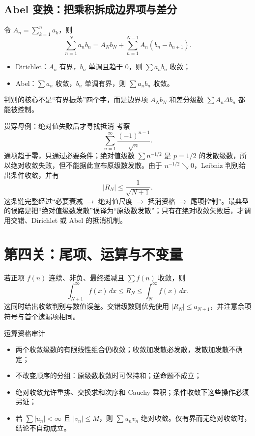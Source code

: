 \documentclass[11pt,a4paper,fontset=fandol]{ctexart}
\begin{document}
\subsection{Abel 变换：把乘积拆成边界项与差分}
令 $A_n=\sum_{k=1}^{n}a_k$，则
\[
\sum_{n=1}^{N}a_nb_n=A_Nb_N+\sum_{n=1}^{N-1}A_n(b_n-b_{n+1}).
\]
\begin{itemize}
  \item Dirichlet：$A_n$ 有界，$b_n$ 单调且趋于 $0$，则 $\sum a_nb_n$ 收敛；
  \item Abel：$\sum a_n$ 收敛，$b_n$ 单调有界，则 $\sum a_nb_n$ 收敛。
\end{itemize}
判别的核心不是“有界振荡”四个字，而是边界项 $A_Nb_N$ 和差分级数 $\sum A_n\Delta b_n$ 都能被控制。

\begin{examplebox}{贯穿母例：绝对值失败后才寻找抵消}
考察
\[
\sum_{n=1}^{\infty}\frac{(-1)^{n-1}}{\sqrt n}.
\]
通项趋于零，只通过必要条件；绝对值级数 $\sum n^{-1/2}$ 是 $p=1/2$ 的发散级数，所以绝对收敛失败，但不能据此宣布原级数发散。由于 $n^{-1/2}\searrow0$，Leibniz 判别给出条件收敛，并有
\[
|R_N|\le\frac1{\sqrt{N+1}}.
\]
这条链完整经过“必要衰减 $\to$ 绝对值尺度 $\to$ 抵消资格 $\to$ 尾项控制”。最典型的误路是把“绝对值级数发散”误译为“原级数发散”；只有在绝对收敛失败后，才调用交错、Dirichlet 或 Abel 的抵消机制。
\end{examplebox}

\section{第四关：尾项、运算与不变量}
若正项 $f(n)$ 连续、非负、最终递减且 $\sum f(n)$ 收敛，则
\[
\int_{N+1}^{\infty}f(x)\,dx\le R_N\le\int_N^{\infty}f(x)\,dx.
\]
这同时给出收敛判别与数值误差。交错级数则优先使用 $|R_N|\le a_{N+1}$，并注意余项符号与首个遗漏项相同。

\begin{methodbox}{运算资格审计}
\begin{itemize}
  \item 两个收敛级数的有限线性组合仍收敛；收敛加发散必发散，发散加发散不确定；
  \item 不改变顺序的分组：原级数收敛时可保持和；逆命题不成立；
  \item 绝对收敛允许重排、交换求和次序和 Cauchy 乘积；条件收敛下这些操作必须另证；
  \item 若 $\sum|u_n|<\infty$ 且 $|v_n|\le M$，则 $\sum u_nv_n$ 绝对收敛。仅有界而无绝对收敛时，结论不自动成立。
\end{itemize}
\end{methodbox}
\end{document}
